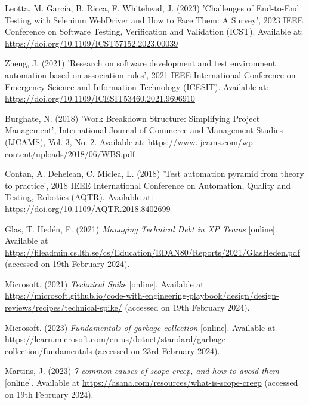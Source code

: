 \noindent Leotta, M. García, B. Ricca, F. Whitehead, J. (2023) 'Challenges of End-to-End Testing with Selenium WebDriver and How to Face Them: A Survey', 2023 IEEE Conference on Software Testing, Verification and Validation (ICST). Available at: \url{https://doi.org/10.1109/ICST57152.2023.00039}
\vspace{0.2cm}

\noindent Zheng, J. (2021) 'Research on software development and test environment automation based on association rules', 2021 IEEE International Conference on Emergency Science and Information Technology (ICESIT). Available at: \url{https://doi.org/10.1109/ICESIT53460.2021.9696910}
\vspace{0.2cm}

\noindent Burghate, N. (2018) 'Work Breakdown Structure: Simplifying Project Management', International Journal of Commerce and Management Studies (IJCAMS), Vol. 3, No. 2. Available at: \url{https://www.ijcams.com/wp-content/uploads/2018/06/WBS.pdf}
\vspace{0.2cm}

\noindent Contan, A. Dehelean, C. Miclea, L. (2018) 'Test automation pyramid from theory to practice', 2018 IEEE International Conference on Automation, Quality and Testing, Robotics (AQTR). Available at: \url{https://doi.org/10.1109/AQTR.2018.8402699}
\vspace{0.2cm}

\noindent Glas, T. Hedén, F. (2021) \textit{Managing Technical Debt in XP Teams} [online]. Available at \url{https://fileadmin.cs.lth.se/cs/Education/EDAN80/Reports/2021/GlasHeden.pdf} (accessed on 19th February 2024).
\vspace{0.2cm}

\noindent Microsoft. (2021) \textit{Technical Spike} [online]. Available at \url{https://microsoft.github.io/code-with-engineering-playbook/design/design-reviews/recipes/technical-spike/} (accessed on 19th February 2024).
\vspace{0.2cm}

\noindent Microsoft. (2023) \textit{Fundamentals of garbage collection} [online]. Available at \url{https://learn.microsoft.com/en-us/dotnet/standard/garbage-collection/fundamentals} (accessed on 23rd February 2024).
\vspace{0.2cm}

\noindent Martins, J. (2023) \textit{7 common causes of scope creep, and how to avoid them} [online]. Available at \url{https://asana.com/resources/what-is-scope-creep} (accessed on 19th February 2024).
\vspace{0.2cm}

